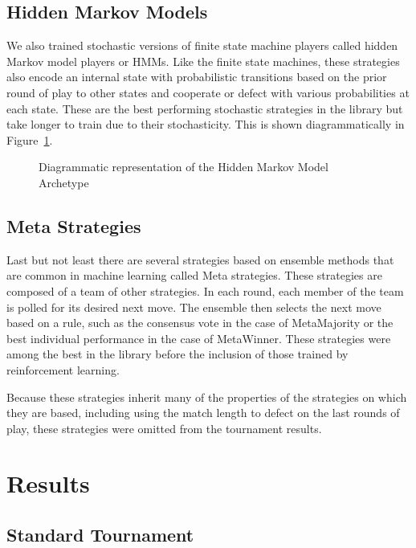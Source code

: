 \documentclass{article}
\begin{document}

\subsection{Hidden Markov Models}

We also trained stochastic versions of finite state machine players called
hidden Markov model players or HMMs. Like the finite state machines, these
strategies also encode an internal
state with probabilistic transitions based on the prior round of play to other
states and cooperate or defect with various probabilities at each state. These
are the best performing stochastic strategies in the library but take longer
to train due to their stochasticity.
This is shown diagrammatically in Figure~\ref{fig:hmm}.

\begin{figure}[!hbtp]
    \centering
    
    \caption{Diagrammatic representation of the Hidden Markov Model Archetype}
    \label{fig:hmm}
\end{figure}


\subsection{Meta Strategies}

Last but not least there are several strategies based on ensemble methods that
are common in machine learning called Meta strategies. These strategies are
composed of a team of other strategies. In each round, each member of the team
is polled for its desired next
move. The ensemble then selects the next move based on a rule, such as the
consensus vote in the case of MetaMajority or the best individual performance
in the case of MetaWinner. These strategies were among the best in the library
before the inclusion of those trained by reinforcement learning.

Because these strategies inherit many of the properties of the strategies
on which they are based, including using the match length to defect on the last
rounds of play, these strategies were omitted from the tournament results.

\section{Results}

\subsection{Standard Tournament}
\end{document}
